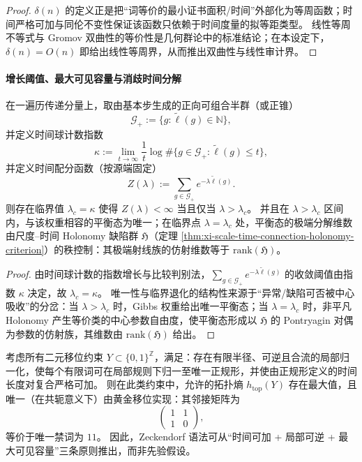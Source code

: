 \begin{proof}
\(\delta(n)\) 的定义正是把“词等价的最小证书面积/时间”外部化为等周函数；时间严格可加与同伦不变性保证该函数只依赖于时间度量的拟等距类型。
线性等周不等式与 Gromov 双曲性的等价性是几何群论中的标准结论；在本设定下，\(\delta(n)=O(n)\) 即给出线性等周界，从而推出双曲性与线性审计界。
\end{proof}

\paragraph{增长阈值、最大可见容量与消歧时间分解}

\begin{theorem}\label{thm:xi-time-phase-transition-growth-and-defect-rank}
在一遍历传递分量上，取由基本步生成的正向可组合半群（或正锥）
\[
\mathcal G_+:=\{g:\widetilde{\ell}(g)\in\mathbb N\},
\]
并定义时间球计数指数
\[
\kappa:=\lim_{t\to\infty}\frac{1}{t}\log \#\{g\in\mathcal G_+:\widetilde{\ell}(g)\le t\},
\]
并定义时间配分函数（按源端固定）
\[
Z(\lambda):=\sum_{g\in\mathcal G_+} e^{-\lambda \widetilde{\ell}(g)}.
\]
则存在临界值 \(\lambda_c=\kappa\) 使得 \(Z(\lambda)<\infty\) 当且仅当 \(\lambda>\lambda_c\)。
并且在 \(\lambda>\lambda_c\) 区间内，与该权重相容的平衡态为唯一；在临界点 \(\lambda=\lambda_c\) 处，平衡态的极端分解维数由尺度--时间 Holonomy 缺陷群 \(\mathfrak H\)（定理 \ref{thm:xi-scale-time-connection-holonomy-criterion}）的秩控制：其极端射线族的仿射维数等于 \(\mathrm{rank}(\mathfrak H)\)。
\end{theorem}

\begin{proof}
由时间球计数的指数增长与比较判别法，\(\sum_{g\in\mathcal G_+} e^{-\lambda\widetilde\ell(g)}\) 的收敛阈值由指数 \(\kappa\) 决定，故 \(\lambda_c=\kappa\)。
唯一性与临界退化的结构性来源于“异常/缺陷可否被中心吸收”的分岔：当 \(\lambda>\lambda_c\) 时，Gibbs 权重给出唯一平衡态；当 \(\lambda=\lambda_c\) 时，非平凡 Holonomy 产生等价类的中心参数自由度，使平衡态形成以 \(\mathfrak H\) 的 Pontryagin 对偶为参数的仿射族，其维数由 \(\mathrm{rank}(\mathfrak H)\) 给出。
\end{proof}

\begin{theorem}\label{thm:xi-zeckendorf-golden-shift-max-capacity}
考虑所有二元移位约束 \(Y\subset\{0,1\}^{\mathbb Z}\)，满足：存在有限半径、可逆且合流的局部归一化，使每个有限词可在局部规则下归一至唯一正规形，并使由正规形定义的时间长度对复合严格可加。
则在此类约束中，允许的拓扑熵 \(h_{\mathrm{top}}(Y)\) 存在最大值，且唯一（在共轭意义下）由黄金移位实现：其邻接矩阵为
\[
\begin{pmatrix}
1 & 1\\[2pt]
1 & 0
\end{pmatrix},
\]
等价于唯一禁词为 \(11\)。
因此，Zeckendorf 语法可从“时间可加 + 局部可逆 + 最大可见容量”三条原则推出，而非先验假设。
\end{theorem}

